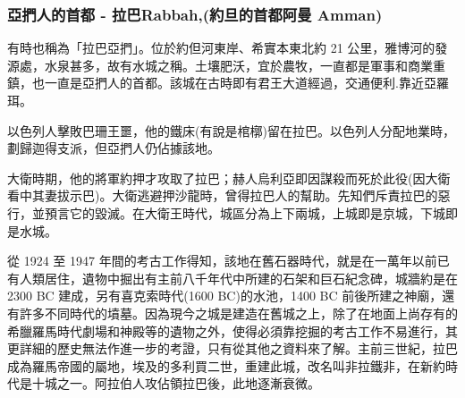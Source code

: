 \subsubsection{亞捫人的首都 - 拉巴Rabbah,(約旦的首都阿曼 Amman)}

有時也稱為「拉巴亞捫」。位於約但河東岸、希實本東北約 21 公里，雅博河的發源處，水泉甚多，故有水城之稱。土壤肥沃，宜於農牧，一直都是軍事和商業重鎮，也一直是亞捫人的首都。該城在古時即有君王大道經過，交通便利.靠近亞羅珥。

以色列人擊敗巴珊王噩，他的鐵床(有說是棺槨)留在拉巴。以色列人分配地業時，劃歸迦得支派，但亞捫人仍佔據該地。

大衛時期，他的將軍約押才攻取了拉巴；赫人烏利亞即因謀殺而死於此役(因大衛看中其妻拔示巴)。大衛逃避押沙龍時，曾得拉巴人的幫助。先知們斥責拉巴的惡行，並預言它的毀滅。在大衛王時代，城區分為上下兩城，上城即是京城，下城即是水城。

從 1924 至 1947 年間的考古工作得知，該地在舊石器時代，就是在一萬年以前已有人類居住，遺物中掘出有主前八千年代中所建的石架和巨石紀念碑，城牆約是在 2300 BC 建成，另有喜克索時代(1600 BC)的水池，1400 BC 前後所建之神廟，還有許多不同時代的墳墓。因為現今之城是建造在舊城之上，除了在地面上尚存有的希臘羅馬時代劇場和神殿等的遺物之外，使得必須靠挖掘的考古工作不易進行，其更詳細的歷史無法作進一步的考證，只有從其他之資料來了解。主前三世紀，拉巴成為羅馬帝國的屬地，埃及的多利買二世，重建此城，改名叫非拉鐵非，在新約時代是十城之一。阿拉伯人攻佔領拉巴後，此地逐漸衰微。


